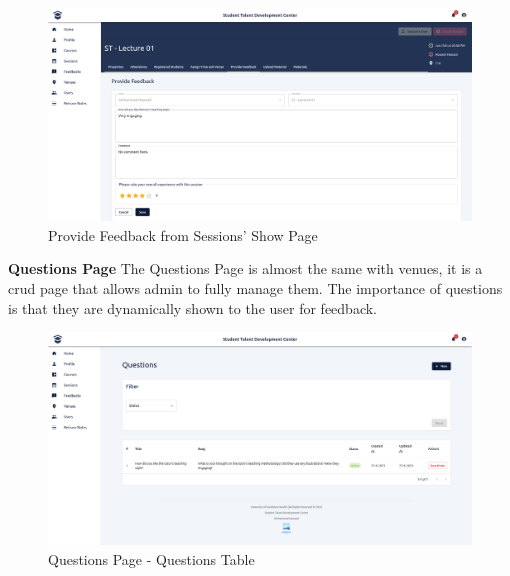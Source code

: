 \begin{justify}
    \begin{figure}[H]
        \centerline{\includegraphics[width=150mm,scale=1]{figures/implementation_and_testing/implementation/frontend/pages/Feedback - Provide Feedback.png}}
        \caption{Provide Feedback from Sessions' Show Page}
    \end{figure}


    \clearpage
    \noindent \textbf{Questions Page}\newendline
    The Questions Page is almost the same with venues, it is a crud page that allows admin to fully manage them. The importance of questions is that they are dynamically shown to the user for feedback.

    \begin{figure}[H]
        \centerline{\includegraphics[width=150mm,scale=1]{figures/implementation_and_testing/implementation/frontend/pages/Questions Table.png}}
        \caption{Questions Page - Questions Table}
    \end{figure}


\end{justify}
